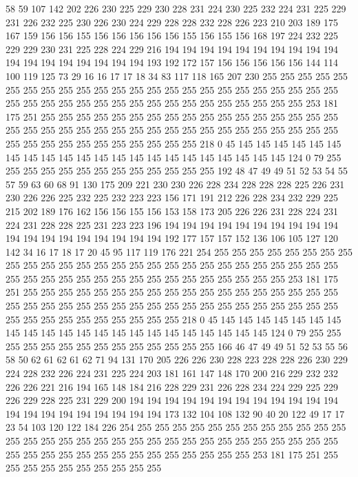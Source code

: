 58 59 107 142 202 226 230 225 229 230 228 231 224 230 225 232 224 231 225 229
231 226 232 225 230 226 230 224 229 228 228 232 228 226 223 210 203 189 175 167
159 156 156 155 156 156 156 156 156 155 156 155 156 168 197 224 232 225 229 229
230 231 225 228 224 229 216 194 194 194 194 194 194 194 194 194 194 194 194 194
194 194 194 194 194 193 192 172 157 156 156 156 156 156 144 114 100 119 125 73
29 16 16 17 17 18 34 83 117 118 165 207 230 255 255 255 255 255 255 255
255 255 255 255 255 255 255 255 255 255 255 255 255 255 255 255 255 255 255 255
255 255 255 255 255 255 255 255 255 255 255 255 255 255 253 181 175 251 255 255
255 255 255 255 255 255 255 255 255 255 255 255 255 255 255 255 255 255 255 255
255 255 255 255 255 255 255 255 255 255 255 255 255 255 255 255 255 255 255 255
255 255 255 255 255 218 0 45 145 145 145 145 145 145 145 145 145 145 145 145
145 145 145 145 145 145 145 145 145 145 124 0 79 255 255 255 255 255 255 255
255 255 255 255 255 255 192 48 47 49 49 51 52 53 54 55 57 59 63 60
68 91 130 175 209 221 230 230 226 228 234 228 228 228 225 226 231 230 226 226
225 232 225 232 223 223 156 171 191 212 226 228 234 232 229 225 215 202 189 176
162 156 156 155 156 153 158 173 205 226 226 231 228 224 231 224 231 228 228 225
231 223 223 196 194 194 194 194 194 194 194 194 194 194 194 194 194 194 194 194
194 194 194 192 177 157 157 152 136 106 105 127 120 142 34 16 17 18 17 20
45 95 117 119 176 221 254 255 255 255 255 255 255 255 255 255 255 255 255 255
255 255 255 255 255 255 255 255 255 255 255 255 255 255 255 255 255 255 255 255
255 255 255 255 255 255 255 255 255 255 253 181 175 251 255 255 255 255 255 255
255 255 255 255 255 255 255 255 255 255 255 255 255 255 255 255 255 255 255 255
255 255 255 255 255 255 255 255 255 255 255 255 255 255 255 255 255 255 255 255
255 218 0 45 145 145 145 145 145 145 145 145 145 145 145 145 145 145 145 145
145 145 145 145 145 145 124 0 79 255 255 255 255 255 255 255 255 255 255 255
255 255 255 166 46 47 49 49 51 52 53 55 56 58 50 62 61 62 61 62
71 94 131 170 205 226 226 230 228 223 228 228 226 230 229 224 228 232 226 224
231 225 224 203 181 161 147 148 170 200 216 229 232 232 226 226 221 216 194 165
148 184 216 228 229 231 226 228 234 224 229 225 229 226 229 228 225 231 229 200
194 194 194 194 194 194 194 194 194 194 194 194 194 194 194 194 194 194 194 194
194 173 132 104 108 132 90 40 20 122 49 17 17 23 54 103 120 122 184 226
254 255 255 255 255 255 255 255 255 255 255 255 255 255 255 255 255 255 255 255
255 255 255 255 255 255 255 255 255 255 255 255 255 255 255 255 255 255 255 255
255 255 255 255 255 255 253 181 175 251 255 255 255 255 255 255 255 255 255 255
